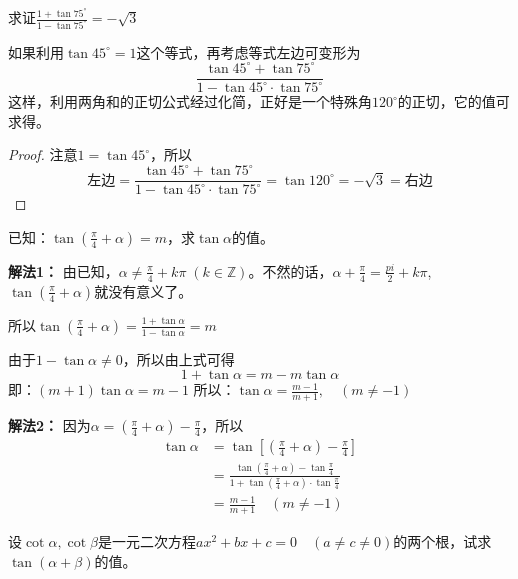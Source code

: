 \begin{example}
求证$\frac{1+\tan 75^{\circ}}{1-\tan 75^{\circ}}=-\sqrt{3}$
\end{example}

\begin{analyze}
如果利用$\tan45^{\circ}=1$这个等式，再考虑等式左边可变形为
\[\frac{\tan 45^{\circ}+\tan 75^{\circ}}{1-\tan 45^{\circ}\cdot \tan 75^{\circ}}\]
这样，利用两角和的正切公式经过化简，正好是一个特殊角$120^{\circ}$的正切，它的值可求得。
\end{analyze}

\begin{proof}
注意$1=\tan 45^{\circ}$，所以
\[\text{左边}=\frac{\tan 45^{\circ}+\tan 75^{\circ}}{1-\tan 45^{\circ}\cdot \tan 75^{\circ}}=\tan 120^{\circ}=-\sqrt{3}=\text{右边}\]
\end{proof}


\begin{example}
    已知：$\tan\left(\frac{\pi}{4}+\alpha\right)=m$，求$\tan\alpha$的值。
\end{example}

\begin{solution}
\textbf{解法1：} 由已知，$\alpha\ne \frac{\pi}{4}+k\pi\; (k\in\mathbb{Z})$。不然的话，$\alpha+\frac{\pi}{4}=\frac{pi}{2}+k\pi$, $\tan\left(\frac{\pi}{4}+\alpha\right)$就没有意义了。

所以$\tan\left(\frac{\pi}{4}+\alpha\right)=\frac{1+\tan\alpha}{1-\tan\alpha}=m$

由于$1-\tan\alpha\ne 0$，所以由上式可得
\[1+\tan\alpha=m-m\tan\alpha\]
即：$(m+1)\tan\alpha=m-1$
所以：$\tan\alpha=\frac{m-1}{m+1},\quad (m\ne -1)$

\textbf{解法2：} 因为$\alpha=\left(\frac{\pi}{4}+\alpha\right)-\frac{\pi}{4}$，所以
\[\begin{split}
   \tan \alpha&=\tan\left[\left(\frac{\pi}{4}+\alpha\right)-\frac{\pi}{4}\right] \\
   &=\frac{\tan\left(\frac{\pi}{4}+\alpha\right)-\tan\frac{\pi}{4}}{1+\tan\left(\frac{\pi}{4}+\alpha\right)\cdot \tan\frac{\pi}{4}}\\
   &=\frac{m-1}{m+1}\quad (m\ne -1)
\end{split}\]
\end{solution}



\begin{example}
设$\cot\alpha, \cot\beta$是一元二次方程$ax^2+bx+c=0\quad (a\ne c\ne 0)$的两个根，试求$\tan (\alpha+\beta)$的值。
\end{example}

